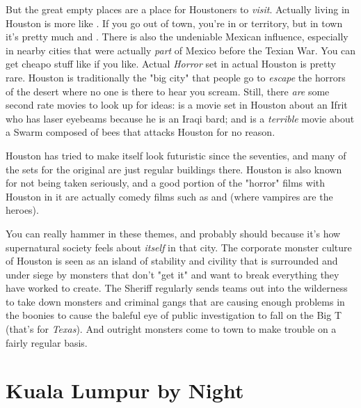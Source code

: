 But the great empty places are a place for Houstoners to \textit{visit}. Actually living in Houston is more like . If you go out of town, you're in  or  territory, but in town it's pretty much  and . There is also the undeniable Mexican influence, especially in nearby cities that were actually \textit{part} of Mexico before the Texian War. You can get cheapo stuff like  if you like. Actual \textit{Horror} set in actual Houston is pretty rare. Houston is traditionally the "big city" that people go to \textit{escape} the horrors of the desert where no one is there to hear you scream. Still, there \textit{are} some second rate movies to look up for ideas:  is a movie set in Houston about an Ifrit who has laser eyebeams because he is an Iraqi bard; and  is a \textit{terrible} movie about a Swarm composed of bees that attacks Houston for no reason.

Houston has tried to make itself look futuristic since the seventies, and many of the sets for the original  are just regular buildings there. Houston is also known for not being taken seriously, and a good portion of the "horror" films with Houston in it are actually comedy films such as  and  (where vampires are the heroes).

You can really hammer in these themes, and probably should because it's how supernatural society feels about \textit{itself} in that city. The corporate monster culture of Houston is seen as an island of stability and civility that is surrounded and under siege by monsters that don't "get it" and want to break everything they have worked to create. The Sheriff regularly sends teams out into the wilderness to take down monsters and criminal gangs that are causing enough problems in the boonies to cause the baleful eye of public investigation to fall on the Big T (that's for \textit{Texas}). And outright monsters come to town to make trouble on a fairly regular basis.

\section{Kuala Lumpur by Night}

